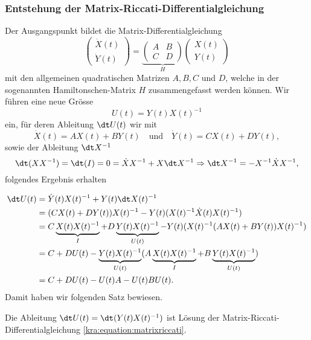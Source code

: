 \subsubsection{Entstehung der Matrix-Riccati-Differentialgleichung}
Der Ausgangspunkt bildet die Matrix-Differentialgleichung
\begin{equation}
    \label{kra:equation:matrix-dgl}
    \begin{pmatrix}
        \dot{X}(t) \\
        \dot{Y}(t)
    \end{pmatrix}
    =
    \underbrace{
        \begin{pmatrix}
            A & B \\
            C & D
        \end{pmatrix}
    }_{\displaystyle{H}}
    \begin{pmatrix}
        X(t) \\
        Y(t)
    \end{pmatrix}
\end{equation}
mit den allgemeinen quadratischen Matrizen $A, B, C$ und $D$, welche in der sogenannten Hamiltonschen-Matrix $H$ zusammengefasst werden können.
Wir führen eine neue Grösse
\[
    U(t) = Y(t)X(t)^{-1}
\]
ein, für deren Ableitung $\dt U(t)$ wir mit
\[
    \dot{X}(t) = AX(t) + BY(t) \quad \text{und} \quad \dot{Y}(t) = CX(t) + DY(t),
\]
sowie der Ableitung $\dt X^{-1}$
\[
    \dt (X X^{-1}) = \dt (I) = 0 = \dot{X} X^{-1} + X \dt X^{-1} \Rightarrow \dt X^{-1} = - X^{-1} \dot{X} X^{-1},
\]
folgendes Ergebnis erhalten

\begin{equation}
    \label{kra:equation:feder-masse-riccati-matrix}
    \begin{split}
        \dt U(t)   &= \dot{Y}(t) X(t)^{-1} + Y(t) \dt X(t)^{-1} \\
        &= (CX(t) + DY(t)) X(t)^{-1} - Y(t) (X(t)^{-1} \dot{X}(t) X(t)^{-1}) \\
        &= C\underbrace{X(t)X(t)^{-1}}_\text{$I$} + D\underbrace{Y(t)X(t)^{-1}}_\text{$U(t)$} - Y(t)(X(t)^{-1} (AX(t) + BY(t)) X(t)^{-1}) \\
        &= C + DU(t) - \underbrace{Y(t)X(t)^{-1}}_\text{$U(t)$}(A\underbrace{X(t)X(t)^{-1}}_\text{$I$} + B\underbrace{Y(t)X(t)^{-1}}_\text{$U(t)$}) \\
        &= C  + DU(t) - U(t)A - U(t)BU(t).
    \end{split}
\end{equation}
Damit haben wir folgenden Satz bewiesen.
\begin{satz}
    \label{kra:satz:riccati-matrix-dgl}
    Die Ableitung $\dt U(t) = \dt (Y(t)X(t)^{-1})$ ist Lösung der Matrix-Riccati-Differentialgleichung \eqref{kra:equation:matrixriccati}.
\end{satz}

